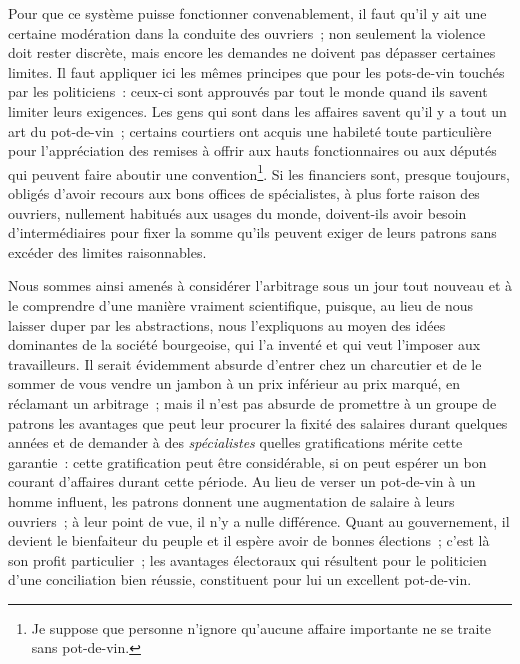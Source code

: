 \documentclass[french,twoside]{book} %
\begin{document}
Pour que ce système puisse fonctionner convenablement, il faut qu’il y ait une certaine modération dans la conduite des ouvriers ; non seulement la violence doit rester discrète, mais encore les demandes ne doivent pas dépasser certaines limites. Il faut appliquer ici les mêmes principes que pour les pots-de-vin touchés par les politiciens : ceux-ci sont approuvés par tout le monde quand ils savent limiter leurs exigences. Les gens qui sont dans les affaires savent qu’il y a tout un art du pot-de-vin ; certains courtiers ont acquis une habileté toute particulière pour l’appréciation des remises à offrir aux hauts fonctionnaires ou aux députés qui peuvent faire aboutir une convention\footnote{ \noindent Je suppose que personne n’ignore qu’aucune affaire importante ne se traite sans pot-de-vin.
 }. Si les financiers sont, presque toujours, obligés d’avoir recours aux bons offices de spécialistes, à plus forte raison des ouvriers, nullement habitués aux usages du monde, doivent-ils  avoir besoin d’intermédiaires pour fixer la somme qu’ils peuvent exiger de leurs patrons sans excéder des limites raisonnables.\par
Nous sommes ainsi amenés à considérer l’arbitrage sous un jour tout nouveau et à le comprendre d’une manière vraiment scientifique, puisque, au lieu de nous laisser duper par les abstractions, nous l’expliquons au moyen des idées dominantes de la société bourgeoise, qui l’a inventé et qui veut l’imposer aux travailleurs. Il serait évidemment absurde d’entrer chez un charcutier et de le sommer de vous vendre un jambon à un prix inférieur au prix marqué, en réclamant un arbitrage ; mais il n’est pas absurde de promettre à un groupe de patrons les avantages que peut leur procurer la fixité des salaires durant quelques années et de demander à des \emph{spécialistes} quelles gratifications mérite cette garantie : cette gratification peut être considérable, si on peut espérer un bon courant d’affaires durant cette période. Au lieu de verser un pot-de-vin à un homme influent, les patrons donnent une augmentation de salaire à leurs ouvriers ; à leur point de vue, il n’y a nulle différence. Quant au gouvernement, il devient le bienfaiteur du peuple et il espère avoir de bonnes élections ; c’est là son profit particulier ; les avantages électoraux qui résultent pour le politicien d’une conciliation bien réussie, constituent pour lui un excellent pot-de-vin.\par
\end{document}
